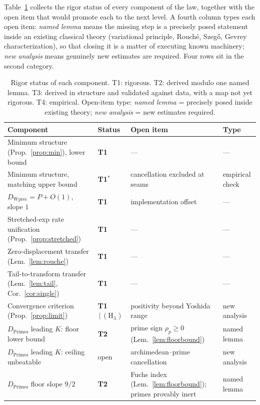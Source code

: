 \documentclass[11pt,a4paper]{article}
\begin{document}
Table~\ref{tab:tiers} collects the rigor status of every component of the law,
together with the open item that would promote each to the next level. A
fourth column types each open item: \emph{named lemma} means
the missing step is a precisely posed statement inside an existing classical
theory (variational principle, Rouch\'e, Szeg\H{o}, Gevrey characterization),
so that closing it is a matter of executing known machinery; \emph{new
analysis} means genuinely new estimates are required. Four rows sit in the
second category.

\begin{table}[H]
\centering
\caption{Rigor status of each component. T1: rigorous. T2: derived modulo one
named lemma. T3: derived in structure and validated against data, with a map not
yet rigorous. T4: empirical. Open-item type: \emph{named lemma} = precisely
posed inside existing theory; \emph{new analysis} = new estimates required.}
\label{tab:tiers}
{\footnotesize\setlength{\tabcolsep}{5pt}%
\begin{tabular}{@{}l l p{4.9cm} l@{}}
\toprule
Component & Status & Open item & Type \\
\midrule
Minimum structure (Prop.~\ref{prop:min}), lower bound & \textbf{T1} & --- & --- \\
Minimum structure, matching upper bound & \textbf{T1}$^\ast$ & cancellation excluded at seams & empirical check \\
$D_{\mathrm{Wprec}}=P+O(1)$, slope $1$ & \textbf{T1} & implementation offset & --- \\
Stretched-exp rate unification (Prop.~\ref{prop:stretched}) & \textbf{T1} & --- & --- \\
Zero-displacement transfer (Lem.~\ref{lem:rouche}) & \textbf{T1} & --- & --- \\
Tail-to-transform transfer (Lem.~\ref{lem:tail}, Cor.~\ref{cor:single}) & \textbf{T1} & --- & --- \\
Convergence criterion (Prop.~\ref{prop:limit}) & \textbf{T1}$\,|\,(\mathrm{H}_\lambda)$ & positivity beyond Yoshida range & new analysis \\
$D_{\mathrm{Primes}}$ leading $K$: floor lower bound & \textbf{T2} & prime sign $\rho_p\ge0$ (Lem.~\ref{lem:floorbound}) & named lemma \\
$D_{\mathrm{Primes}}$ leading $K$: ceiling unbeatable & open & archimedean--prime cancellation & new analysis \\
$D_{\mathrm{Primes}}$ floor slope $9/2$ & \textbf{T2} & Fuchs index (Lem.~\ref{lem:floorbound}); primes provably inert & named lemma \\

\end{tabular}}
\end{table}
\end{document}
